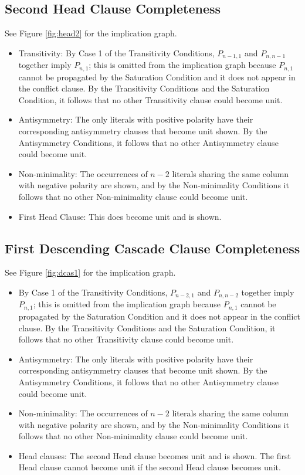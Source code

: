 \documentclass[10pt,a4paper]{article}
\begin{document}
\subsection{Second Head Clause Completeness}
See Figure \ref{fig:head2} for the implication graph.
\begin{itemize}
    \item Transitivity: By Case 1 of the Transitivity Conditions, $P_{n - 1, 1}$ and $P_{n, n - 1}$ together imply $P_{n, 1}$; this is omitted from the implication graph because $P_{n, 1}$ cannot be propagated by the Saturation Condition and it does not appear in the conflict clause. By the Transitivity Conditions and the Saturation Condition, it follows that no other Transitivity clause could become unit.
    \item Antisymmetry: The only literals with positive polarity have their corresponding antisymmetry clauses that become unit shown. By the Antisymmetry Conditions, it follows that no other Antisymmetry clause could become unit. 
    \item Non-minimality: The occurrences of $n - 2$ literals sharing the same column with negative polarity are shown, and by the Non-minimality Conditions it follows that no other Non-minimality clause could become unit. 
    \item First Head Clause: This does become unit and is shown.
\end{itemize}

\subsection{First Descending Cascade Clause Completeness}
See Figure \ref{fig:dcas1} for the implication graph.
\begin{itemize}
    \item By Case 1 of the Transitivity Conditions, $P_{n - 2, 1}$ and $P_{n, n - 2}$ together imply $P_{n, 1}$; this is omitted from the implication graph because $P_{n, 1}$ cannot be propagated by the Saturation Condition and it does not appear in the conflict clause. By the Transitivity Conditions and the Saturation Condition, it follows that no other Transitivity clause could become unit. 
    \item Antisymmetry: The only literals with positive polarity have their corresponding antisymmetry clauses that become unit shown. By the Antisymmetry Conditions, it follows that no other Antisymmetry clause could become unit. 
    \item Non-minimality: The occurrences of $n - 2$ literals sharing the same column with negative polarity are shown, and by the Non-minimality Conditions it follows that no other Non-minimality clause could become unit. 
    \item Head clauses: The second Head clause becomes unit and is shown. The first Head clause cannot become unit if the second Head clause becomes unit. 
\end{itemize}
\end{document}

